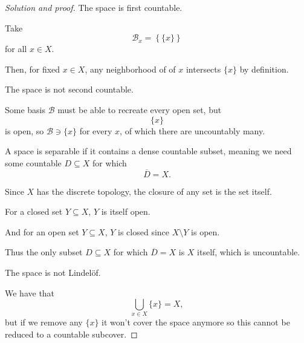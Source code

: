 \documentclass[11pt]{article}
\begin{document}
\begin{proof}[Solution and proof]

    The space is first countable. 

    Take 
    \[
        \mathcal B_x = \left\{\{x\}\right\}
    \]
    for all $x \in X$. 

    Then, for fixed $x \in X$, any neighborhood of 
    of $x$ intersects $\{x\}$ by definition. 


    The space is not second countable.

    Some basis $\mathcal B$ must be able 
    to recreate every open set, but 
    \[
        \{x\}
    \]
    is open, so $\mathcal B \ni \{x\}$ for every $x$, 
    of which there are uncountably many. 


    A space is separable if it contains a 
    dense countable subset, meaning 
    we need some countable $D \subseteq X$ 
    for which 
    \[
        \overline D = X. 
    \] 

    Since $X$ has the discrete topology, 
    the closure of any set is the set itself. 
    
    For a closed set $Y \subseteq X$, $Y$ is itself open. 

    And for an open set $Y \subseteq X$, $Y$ is closed 
    since $X \setminus Y$ is open. 

    Thus the only subset $D \subseteq X$ for which 
    $\overline D = X$ is $X$ itself, which is uncountable. 


    The space is not Lindel{\"o}f. 

    We have that 
    \[
        \bigcup_{x\in X} \{x\} = X, 
    \]
    but if we remove any $\{x\}$ it won't cover the 
    space anymore so this cannot be reduced to a 
    countable subcover.  

\end{proof}
\end{document}
